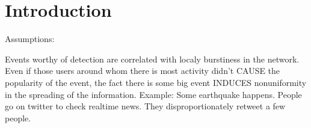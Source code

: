 \chapter{Introduction}


Assumptions:

Events worthy of detection are correlated with localy burstiness in the network. Even if those users around whom there is most activity didn't CAUSE the popularity of the event, the fact there is some big event INDUCES nonuniformity in the spreading of the information. Example: Some earthquake happens. People go on twitter to check realtime news. They disproportionately retweet a few people.
